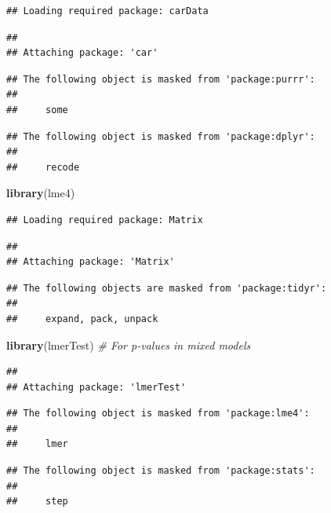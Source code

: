 \documentclass[
]{article}
\newenvironment{Shaded}{\begin{snugshade}}{\end{snugshade}}
\newcommand{\CommentTok}[1]{\textcolor[rgb]{0.56,0.35,0.01}{\textit{#1}}}
\newcommand{\FunctionTok}[1]{\textcolor[rgb]{0.13,0.29,0.53}{\textbf{#1}}}
\newcommand{\NormalTok}[1]{#1}
\begin{document}
\begin{verbatim}
## Loading required package: carData
\end{verbatim}

\begin{verbatim}
## 
## Attaching package: 'car'
\end{verbatim}

\begin{verbatim}
## The following object is masked from 'package:purrr':
## 
##     some
\end{verbatim}

\begin{verbatim}
## The following object is masked from 'package:dplyr':
## 
##     recode
\end{verbatim}

\begin{Shaded}
\begin{Highlighting}[]
\FunctionTok{library}\NormalTok{(lme4)}
\end{Highlighting}
\end{Shaded}

\begin{verbatim}
## Loading required package: Matrix
\end{verbatim}

\begin{verbatim}
## 
## Attaching package: 'Matrix'
\end{verbatim}

\begin{verbatim}
## The following objects are masked from 'package:tidyr':
## 
##     expand, pack, unpack
\end{verbatim}

\begin{Shaded}
\begin{Highlighting}[]
\FunctionTok{library}\NormalTok{(lmerTest)   }\CommentTok{\# For p{-}values in mixed models}
\end{Highlighting}
\end{Shaded}

\begin{verbatim}
## 
## Attaching package: 'lmerTest'
\end{verbatim}

\begin{verbatim}
## The following object is masked from 'package:lme4':
## 
##     lmer
\end{verbatim}

\begin{verbatim}
## The following object is masked from 'package:stats':
## 
##     step
\end{verbatim}
\end{document}
